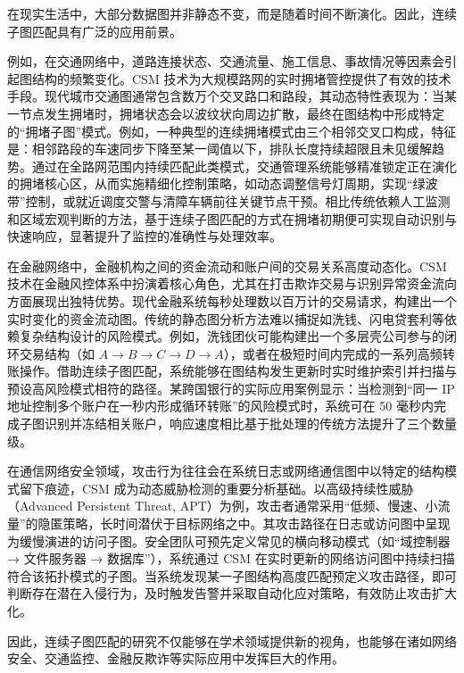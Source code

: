 在现实生活中，大部分数据图并非静态不变，而是随着时间不断演化。因此，连续子图匹配具有广泛的应用前景。

例如，在交通网络中，道路连接状态、交通流量、施工信息、事故情况等因素会引起图结构的频繁变化\cite{traffic-graph-matching-DBLP:journals/pvldb/SongGCW14}。CSM 技术为大规模路网的实时拥堵管控提供了有效的技术手段。现代城市交通图通常包含数万个交叉路口和路段，其动态特性表现为：当某一节点发生拥堵时，拥堵状态会以波纹状向周边扩散，最终在图结构中形成特定的“拥堵子图”模式。例如，一种典型的连续拥堵模式由三个相邻交叉口构成，特征是：相邻路段的车速同步下降至某一阈值以下，排队长度持续超限且未见缓解趋势。通过在全路网范围内持续匹配此类模式，交通管理系统能够精准锁定正在演化的拥堵核心区，从而实施精细化控制策略，如动态调整信号灯周期，实现“绿波带”控制，或就近调度交警与清障车辆前往关键节点干预。相比传统依赖人工监测和区域宏观判断的方法，基于连续子图匹配的方式在拥堵初期便可实现自动识别与快速响应，显著提升了监控的准确性与处理效率。

在金融网络中，金融机构之间的资金流动和账户间的交易关系高度动态化\cite{csm-timing-DBLP:conf/icde/Li0O019}。CSM 技术在金融风控体系中扮演着核心角色，尤其在打击欺诈交易与识别异常资金流向方面展现出独特优势。现代金融系统每秒处理数以百万计的交易请求，构建出一个实时变化的资金流动图。传统的静态图分析方法难以捕捉如洗钱、闪电贷套利等依赖复杂结构设计的风险模式。例如，洗钱团伙可能构建出一个多层壳公司参与的闭环交易结构（如 $A \rightarrow B \rightarrow C \rightarrow D \rightarrow A$），或者在极短时间内完成的一系列高频转账操作。借助连续子图匹配，系统能够在图结构发生更新时实时维护索引并扫描与预设高风险模式相符的路径。某跨国银行的实际应用案例显示：当检测到“同一 IP 地址控制多个账户在一秒内形成循环转账”的风险模式时，系统可在 50 毫秒内完成子图识别并冻结相关账户，响应速度相比基于批处理的传统方法提升了三个数量级。

在通信网络安全领域，攻击行为往往会在系统日志或网络通信图中以特定的结构模式留下痕迹，CSM 成为动态威胁检测的重要分析基础\cite{static-topk-Gupta-DBLP:conf/icde/GuptaGYCH14}。以高级持续性威胁（Advanced Persistent Threat, APT）为例，攻击者通常采用“低频、慢速、小流量”的隐匿策略，长时间潜伏于目标网络之中。其攻击路径在日志或访问图中呈现为缓慢演进的访问子图。安全团队可预先定义常见的横向移动模式（如“域控制器 → 文件服务器 → 数据库”），系统通过 CSM 在实时更新的网络访问图中持续扫描符合该拓扑模式的子图。当系统发现某一子图结构高度匹配预定义攻击路径，即可判断存在潜在入侵行为，及时触发告警并采取自动化应对策略，有效防止攻击扩大化。

因此，连续子图匹配的研究不仅能够在学术领域提供新的视角，也能够在诸如网络安全、交通监控、金融反欺诈等实际应用中发挥巨大的作用。

